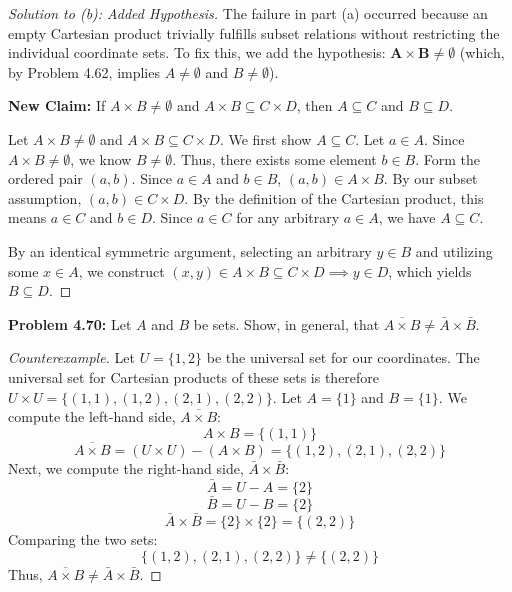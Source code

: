 \documentclass[12pt]{article}
\theoremstyle{definition}
\theoremstyle{remark}
\begin{document}
\begin{proof}[Solution to (b): Added Hypothesis]
The failure in part (a) occurred because an empty Cartesian product trivially fulfills subset relations without restricting the individual coordinate sets. To fix this, we add the hypothesis: $\mathbf{A \times B \neq \emptyset}$ (which, by Problem 4.62, implies $A \neq \emptyset$ and $B \neq \emptyset$).

\textbf{New Claim:} If $A \times B \neq \emptyset$ and $A \times B \subseteq C \times D$, then $A \subseteq C$ and $B \subseteq D$.

Let $A \times B \neq \emptyset$ and $A \times B \subseteq C \times D$. We first show $A \subseteq C$. 
Let $a \in A$. Since $A \times B \neq \emptyset$, we know $B \neq \emptyset$. Thus, there exists some element $b \in B$. 
Form the ordered pair $(a, b)$. Since $a \in A$ and $b \in B$, $(a, b) \in A \times B$. 
By our subset assumption, $(a, b) \in C \times D$. By the definition of the Cartesian product, this means $a \in C$ and $b \in D$. 
Since $a \in C$ for any arbitrary $a \in A$, we have $A \subseteq C$.

By an identical symmetric argument, selecting an arbitrary $y \in B$ and utilizing some $x \in A$, we construct $(x, y) \in A \times B \subseteq C \times D \implies y \in D$, which yields $B \subseteq D$.
\end{proof}

\vspace{0.5cm}

\textbf{Problem 4.70:} Let $A$ and $B$ be sets. Show, in general, that $\overline{A \times B} \neq \bar{A} \times \bar{B}$.

\begin{proof}[Counterexample]
Let $U = \{1, 2\}$ be the universal set for our coordinates. The universal set for Cartesian products of these sets is therefore $U \times U = \{(1,1), (1,2), (2,1), (2,2)\}$.
Let $A = \{1\}$ and $B = \{1\}$.
We compute the left-hand side, $\overline{A \times B}$:
\[ A \times B = \{(1, 1)\} \]
\[ \overline{A \times B} = (U \times U) - (A \times B) = \{(1,2), (2,1), (2,2)\} \]
Next, we compute the right-hand side, $\bar{A} \times \bar{B}$:
\[ \bar{A} = U - A = \{2\} \]
\[ \bar{B} = U - B = \{2\} \]
\[ \bar{A} \times \bar{B} = \{2\} \times \{2\} = \{(2, 2)\} \]
Comparing the two sets:
\[ \{(1,2), (2,1), (2,2)\} \neq \{(2,2)\} \]
Thus, $\overline{A \times B} \neq \bar{A} \times \bar{B}$.
\end{proof}

\newpage
\end{document}
